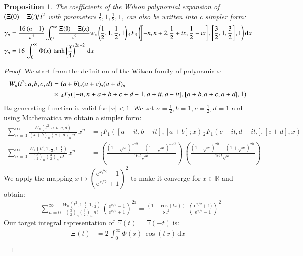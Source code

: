 \documentclass[a4paper,11pt,twoside]{amsart}
\newtheorem{proposition}[theorem]{Proposition}
\begin{document}
\begin{proposition}
The coefficients of the Wilson polynomial expansion of $\left(\Xi(0) -\Xi(t)\right/t^2$ with parameters $\frac12,1,\frac12,1$, can also be written into a simpler form: \notag \\  
\begin{align}
\gamma_n &=\frac{16\,(n+1)}{\pi^3}\int_{0^+}^\infty   \frac{\Xi(0) -\Xi(x)}{x^2}w_x\left(\frac12,1,\frac12,1\right){}_4F_3\left(\left[-n, n+2,\frac12+ix, \frac12- ix\right],\left[\frac32, 1, \frac32\right], 1\right) \mathrm{d}x \notag \\
\gamma_n &= 16\,\int_{0}^\infty \Phi(x)\,\tanh\left(\frac{x}{4}\right)^{2n+2}\, \mathrm{d}x \notag
\end{align}
\end{proposition}
\begin{proof}
We start from the definition of the Wilson family of polynomials:
\begin{align}
 W_n(t^2;a,b,c,d) &= (a+b)_n(a+c)_n(a+d)_n\, \\
  &\times\, {}_4F_3([-n, n+ a+b+c+d-1,a+it, a- it], [a+b, a+c, a+d], 1) \notag
\end{align}
Its generating function is valid for $|x| < 1$. We set $a=\frac12,b=1,c=\frac12,d=1$ and using Mathematica we obtain a simpler form: 
\begin{align}
 \sum_{n=0}^\infty \frac{W_n(t^2;a,b,c,d)}{(a+b)_n(c+d)_n\,n!}\, x^n &= {}_2F_1\left([a+it, b+it],[a+b] ;x\right)\,{}_2F_1\left(c-it, d-it,],[c+d],x\right) \\
 \sum_{n=0}^\infty \frac{W_n\left(t^2;1,\frac12,1,\frac12\right)}{\left(\frac32\right)_n\left(\frac32\right)_n\,n!}\,x^n&= \left(\frac{(1-\sqrt{x})^{-2it}-(1+\sqrt{x})^{-2it}}{16\,t\sqrt{x}}\right)\,\left(\frac{(1-\sqrt{x})^{2it}-(1+\sqrt{x})^{2it}}{16\,t\sqrt{x}}\right)
\end{align} 
We apply the mapping $x \mapsto \left(\dfrac{\textrm{e}^{x/2}-1}{\textrm{e}^{x/2}+1}\right)^2$ to make it converge for $x \in \mathbb{R}$ and obtain: 
\begin{align}
 &\sum_{n=0}^\infty \frac{W_n\left(t^2;1,\frac12,1,\frac12\right)}{\left(\frac32\right)_n\left(\frac32\right)_n\,n!}\, \left(\frac{\textrm{e}^{x/2}-1}{\textrm{e}^{x/2}+1}\right)^{2n} = \frac{\left(1-\cos(tx)\right)}{8\,t^2}\,\left(\frac{\textrm{e}^{x/2}+1)}{\textrm{e}^{x/2}-1}\right)^2
\end{align}
Our target integral representation of $\Xi(t) = \Xi(-t)$ is:
\begin{align}
 \Xi(t) &= 2\,\int_{0}^\infty \Phi(x)\,\cos(t\,x)\, \mathrm{d}x \\

\end{align}
\end{proof}
\end{document}
